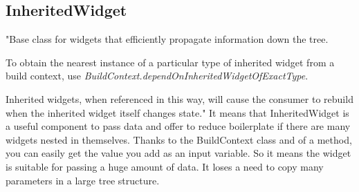 \subsection{InheritedWidget}\label{subsec:inheritedwidget}
"Base class for widgets that efficiently propagate information down the tree.

To obtain the nearest instance of a particular type of inherited widget from a build context, use \textit{BuildContext.dependOnInheritedWidgetOfExactType}\cite{dependOnInheritedWidgetOfExactType}.

Inherited widgets, when referenced in this way, will cause the consumer to rebuild when the inherited widget itself changes state."\cite{inheritedWidget}
It means that InheritedWidget is a useful component to pass data and offer to reduce boilerplate if there are many widgets nested in themselves.
Thanks to the BuildContext class and of a method, you can easily get the value you add as an input variable.
So it means the widget is suitable for passing a huge amount of data.
It loses a need to copy many parameters in a large tree structure.

